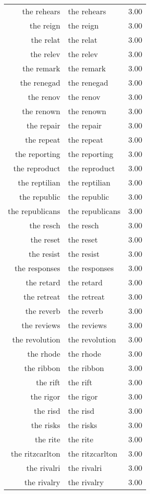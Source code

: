 \begin{table}[ht]
\begin{tabular}{rlr}
  the rehears & the rehears & 3.00 \\ 
  the reign & the reign & 3.00 \\ 
  the relat & the relat & 3.00 \\ 
  the relev & the relev & 3.00 \\ 
  the remark & the remark & 3.00 \\ 
  the renegad & the renegad & 3.00 \\ 
  the renov & the renov & 3.00 \\ 
  the renown & the renown & 3.00 \\ 
  the repair & the repair & 3.00 \\ 
  the repeat & the repeat & 3.00 \\ 
  the reporting & the reporting & 3.00 \\ 
  the reproduct & the reproduct & 3.00 \\ 
  the reptilian & the reptilian & 3.00 \\ 
  the republic & the republic & 3.00 \\ 
  the republicans & the republicans & 3.00 \\ 
  the resch & the resch & 3.00 \\ 
  the reset & the reset & 3.00 \\ 
  the resist & the resist & 3.00 \\ 
  the responses & the responses & 3.00 \\ 
  the retard & the retard & 3.00 \\ 
  the retreat & the retreat & 3.00 \\ 
  the reverb & the reverb & 3.00 \\ 
  the reviews & the reviews & 3.00 \\ 
  the revolution & the revolution & 3.00 \\ 
  the rhode & the rhode & 3.00 \\ 
  the ribbon & the ribbon & 3.00 \\ 
  the rift & the rift & 3.00 \\ 
  the rigor & the rigor & 3.00 \\ 
  the risd & the risd & 3.00 \\ 
  the risks & the risks & 3.00 \\ 
  the rite & the rite & 3.00 \\ 
  the ritzcarlton & the ritzcarlton & 3.00 \\ 
  the rivalri & the rivalri & 3.00 \\ 
  the rivalry & the rivalry & 3.00 \\ 

\end{tabular}
\end{table}
